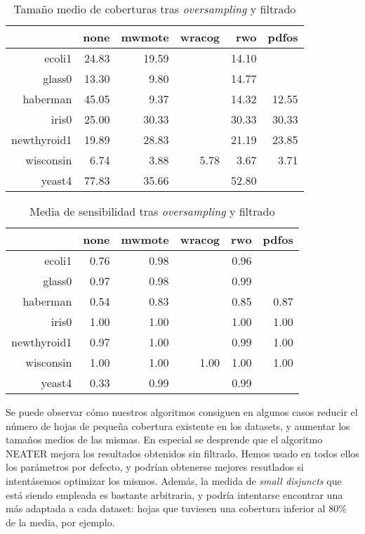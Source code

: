   \begin{table}[H]
  \centering
  \begin{tabular}{rrrrrr}
   \hline
   & none & mwmote & wracog & rwo & pdfos \\ 
   \hline
  ecoli1 & 24.83 & 19.59 &  & 14.10 &  \\ 
  glass0 & 13.30 & 9.80 &  & 14.77 &  \\ 
  haberman & 45.05 & 9.37 &  & 14.32 & 12.55 \\ 
  iris0 & 25.00 & 30.33 &  & 30.33 & 30.33 \\ 
  newthyroid1 & 19.89 & 28.83 &  & 21.19 & 23.85 \\ 
  wisconsin & 6.74 & 3.88 & 5.78 & 3.67 & 3.71 \\ 
  yeast4 & 77.83 & 35.66 &  & 52.80 &  \\ 
   \hline
  \end{tabular}
  \caption{Tamaño medio de coberturas tras \textit{oversampling} y filtrado}
  \end{table}
  
  \begin{table}[H]
  \centering
  \begin{tabular}{rrrrrr}
  \hline
  & none & mwmote & wracog & rwo & pdfos \\ 
  \hline
  ecoli1 & 0.76 & 0.98 &  & 0.96 &  \\ 
  glass0 & 0.97 & 0.98 &  & 0.99 &  \\ 
  haberman & 0.54 & 0.83 &  & 0.85 & 0.87 \\ 
  iris0 & 1.00 & 1.00 &  & 1.00 & 1.00 \\ 
  newthyroid1 & 0.97 & 1.00 &  & 0.99 & 1.00 \\ 
  wisconsin & 1.00 & 1.00 & 1.00 & 1.00 & 1.00 \\ 
  yeast4 & 0.33 & 0.99 &  & 0.99 &  \\ 
  \hline
  \end{tabular}
  \caption{Media de sensibilidad tras \textit{oversampling} y filtrado}
  \end{table}
  
  Se puede observar cómo nuestros algoritmos consiguen en algunos casos reducir el número de hojas de pequeña 
  cobertura existente en los datasets, y aumentar los tamaños medios de las mismas. En especial se desprende que el algoritmo
  NEATER mejora los resultados obtenidos sin filtrado. Hemos usado en todos ellos los parámetros por defecto, y podrían 
  obtenerse mejores resutlados si intentásemos optimizar los mismos. Además, la medida de \textit{small disjuncts} que está
  siendo empleada es bastante arbitraria, y podría intentarse encontrar una más adaptada a cada dataset: hojas que tuviesen
  una cobertura inferior al 80\% de la media, por ejemplo. 
  
